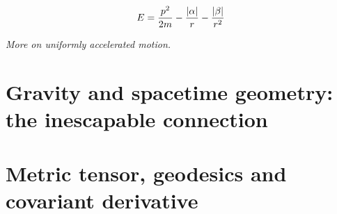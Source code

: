 \documentclass{report}
\begin{document}
\begin{subquests}
\begin{subquests}
		\item
		\begin{align*}
			E = \frac{p^2}{2m} - \frac{\abs{\alpha}}{r} - \frac{\abs{\beta}}{r^2}
		\end{align*}
	\end{subquests}

	\item \emph{More on uniformly accelerated motion.}

\end{subquests}
	
\chapter{Gravity and spacetime geometry: the inescapable connection}


\chapter{Metric tensor, geodesics and covariant derivative}
\end{document}
